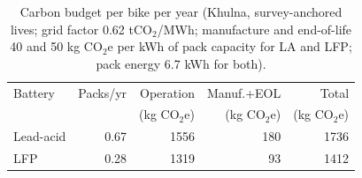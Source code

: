 \begin{table}[t]
\caption{Carbon budget per bike per year (Khulna, survey-anchored lives; grid factor 0.62 tCO$_2$/MWh; manufacture and end-of-life 40 and 50 kg CO$_2$e per kWh of pack capacity for LA and LFP; pack energy 6.7 kWh for both).}
\label{tab:co2bike}
\centering\footnotesize
\begin{tabular}{lrrrr}
\hline
Battery & Packs/yr & Operation & Manuf.+EOL & Total \\
 & & (kg CO$_2$e) & (kg CO$_2$e) & (kg CO$_2$e) \\
\hline
Lead-acid & 0.67 & 1556 & 180 & 1736 \\
LFP & 0.28 & 1319 & 93 & 1412 \\
\hline
\end{tabular}
\end{table}

